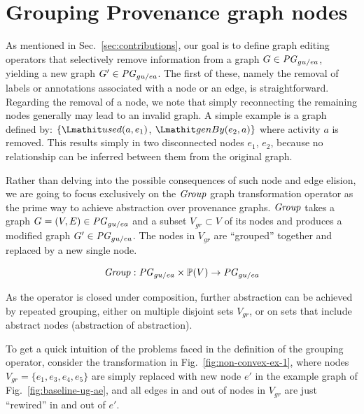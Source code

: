 \section{Grouping Provenance graph nodes}  \label{sec:grouping}




As mentioned in Sec.~\ref{sec:contributions}, our goal is to define graph editing operators that selectively remove information from a graph $G \in \mathit{PG}_{gu/ea}$, yielding a new graph $G' \in \mathit{PG}_{gu/ea}$.
%
The first of these, namely the removal of labels or annotations associated with a node or an edge, is straightforward. 
%
Regarding the removal of a node, we note that simply reconnecting the remaining nodes generally may lead to an invalid graph. 
%
A simple example is a graph defined by: $\{\used(a, e_1)$, $\wgby(e_2, a) \}$ where activity $a$ is removed. This results simply in two disconnected nodes $e_1$, $e_2$, because no relationship can be inferred between them from the original graph.


Rather than delving into the possible consequences of such node and edge elision, we are going to focus exclusively on the $\mathit{Group}$ graph transformation operator as the prime way to achieve abstraction over provenance graphs.
%
$\mathit{Group}$ takes a graph $G = (V, E) \in \mathit{PG}_{gu/ea}$ and a subset $V_{gr} \subset V$ of its nodes  and produces a modified graph $G' \in \mathit{PG}_{gu/ea}$. The nodes in $V_{gr}$ are ``grouped'' together and replaced by a new single node.
%
  
\[ \mathit{Group} : \mathit{PG}_{gu/ea} \times \mathbb{P}(V) \rightarrow \mathit{PG}_{gu/ea} \]
  


%
As the operator is closed under composition, further abstraction can be achieved by repeated grouping, either on multiple disjoint sets $V_{gr}$, or on sets that include abstract nodes (abstraction of abstraction).



%
To get a quick intuition of the  problems faced in the definition of the grouping operator, consider the transformation in Fig.~\ref{fig:non-convex-ex-1}, where nodes $V_{gr} = \{e_1, e_3, e_4, e_5\}$ are simply replaced with new node $e'$ in the example graph of Fig.~\ref{fig:baseline-ug-ae}, and all edges in and out of nodes in $V_{gr}$ are just ``rewired'' in and out of $e'$. 



